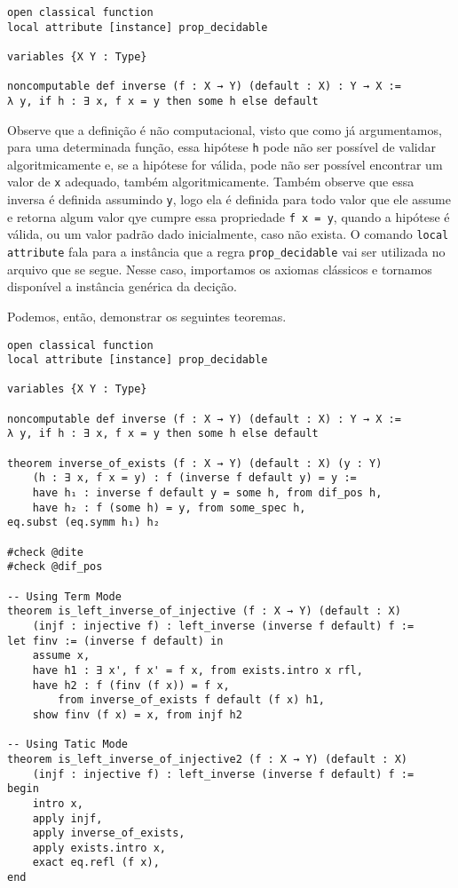 \begin{lstlisting}
open classical function
local attribute [instance] prop_decidable

variables {X Y : Type}

noncomputable def inverse (f : X → Y) (default : X) : Y → X :=
λ y, if h : ∃ x, f x = y then some h else default   
\end{lstlisting}

Observe que a definição é não computacional, visto que como já argumentamos, para uma determinada função, essa 
hipótese \lstinline{h} pode não ser possível de validar algoritmicamente e, se a hipótese for válida, pode não 
ser possível encontrar um valor de \lstinline{x} adequado, também algoritmicamente. Também observe que essa inversa é 
definida assumindo \lstinline{y}, logo ela é definida para todo valor que ele assume e retorna algum valor qye cumpre 
essa propriedade \lstinline{f x = y}, quando a hipótese é válida, ou um valor padrão dado inicialmente, caso não exista. 
O comando \lstinline{local attribute} fala para a instância que a regra \lstinline{prop_decidable} vai ser utilizada no 
arquivo que se segue. Nesse caso, importamos os axiomas clássicos e tornamos disponível a instância genérica da decição.   

Podemos, então, demonstrar os seguintes teoremas. 

\begin{lstlisting}
open classical function
local attribute [instance] prop_decidable

variables {X Y : Type}

noncomputable def inverse (f : X → Y) (default : X) : Y → X :=
λ y, if h : ∃ x, f x = y then some h else default

theorem inverse_of_exists (f : X → Y) (default : X) (y : Y)
    (h : ∃ x, f x = y) : f (inverse f default y) = y :=
    have h₁ : inverse f default y = some h, from dif_pos h,
    have h₂ : f (some h) = y, from some_spec h,
eq.subst (eq.symm h₁) h₂

#check @dite
#check @dif_pos 

-- Using Term Mode 
theorem is_left_inverse_of_injective (f : X → Y) (default : X)
    (injf : injective f) : left_inverse (inverse f default) f :=
let finv := (inverse f default) in
    assume x,
    have h1 : ∃ x', f x' = f x, from exists.intro x rfl,
    have h2 : f (finv (f x)) = f x, 
        from inverse_of_exists f default (f x) h1,
    show finv (f x) = x, from injf h2

-- Using Tatic Mode 
theorem is_left_inverse_of_injective2 (f : X → Y) (default : X)
    (injf : injective f) : left_inverse (inverse f default) f :=
begin 
    intro x,
    apply injf, 
    apply inverse_of_exists,
    apply exists.intro x,
    exact eq.refl (f x), 
end
\end{lstlisting}

